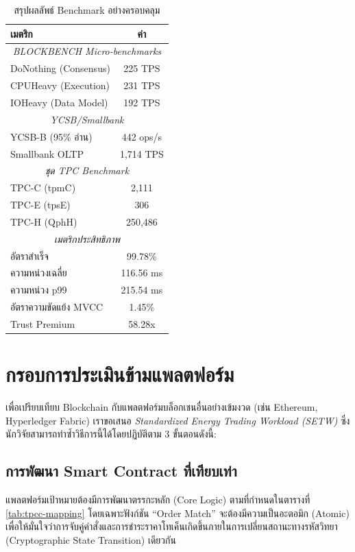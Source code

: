 \documentclass[conference,10pt]{IEEEtran}
\begin{document}
\begin{table}[t!]
\caption{สรุปผลลัพธ์ Benchmark อย่างครอบคลุม}
\begin{center}
\begin{tabular}{|l|c|}
\hline
\textbf{เมตริก} & \textbf{ค่า} \\
\hline
\multicolumn{2}{|c|}{\textit{BLOCKBENCH Micro-benchmarks}} \\
\hline
DoNothing (Consensus) & 225 TPS \\
CPUHeavy (Execution) & 231 TPS \\
IOHeavy (Data Model) & 192 TPS \\
\hline
\multicolumn{2}{|c|}{\textit{YCSB/Smallbank}} \\
\hline
YCSB-B (95\% อ่าน) & 442 ops/s \\
Smallbank OLTP & 1,714 TPS \\
\hline
\multicolumn{2}{|c|}{\textit{ชุด TPC Benchmark}} \\
\hline
TPC-C (tpmC) & 2,111 \\
TPC-E (tpsE) & 306 \\
TPC-H (QphH) & 250,486 \\
\hline
\multicolumn{2}{|c|}{\textit{เมตริกประสิทธิภาพ}} \\
\hline
อัตราสำเร็จ & 99.78\% \\
ความหน่วงเฉลี่ย & 116.56 ms \\
ความหน่วง p99 & 215.54 ms \\
อัตราความขัดแย้ง MVCC & 1.45\% \\
Trust Premium & 58.28x \\
\hline
\end{tabular}
\label{tab:benchmark-results}
\end{center}
\end{table}

\section{กรอบการประเมินข้ามแพลตฟอร์ม}
เพื่อเปรียบเทียบ Blockchain กับแพลตฟอร์มบล็อกเชนอื่นอย่างเข้มงวด (เช่น Ethereum, Hyperledger Fabric) \cite{b4} เราขอเสนอ \textit{Standardized Energy Trading Workload (SETW)} ซึ่งนักวิจัยสามารถทำซ้ำวิธีการนี้ได้โดยปฏิบัติตาม 3 ขั้นตอนดังนี้:

\subsection{การพัฒนา Smart Contract ที่เทียบเท่า}
แพลตฟอร์มเป้าหมายต้องมีการพัฒนาตรรกะหลัก (Core Logic) ตามที่กำหนดในตารางที่ \ref{tab:tpcc-mapping} โดยเฉพาะฟังก์ชัน ``Order Match'' จะต้องมีความเป็นอะตอมิก (Atomic) เพื่อให้มั่นใจว่าการจับคู่คำสั่งและการชำระราคาโทเค็นเกิดขึ้นภายในการเปลี่ยนสถานะทางรหัสวิทยา (Cryptographic State Transition) เดียวกัน
\end{document}
